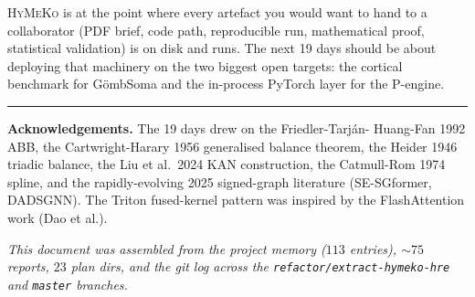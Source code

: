 \documentclass[11pt,a4paper]{article}
\theoremstyle{plain}
\theoremstyle{definition}
\newcommand{\HyMeKo}{\textsc{HyMeKo}}
\newcommand{\code}[1]{\texttt{\small #1}}
\begin{document}
\HyMeKo{} is at the point where every artefact you would want to
hand to a collaborator (PDF brief, code path, reproducible run,
mathematical proof, statistical validation) is on disk and runs.
The next 19 days should be about deploying that machinery on the
two biggest open targets: the cortical benchmark for GömbSoma
and the in-process PyTorch layer for the P-engine.

\vspace{8pt}\hrule\vspace{3pt}
\noindent\footnotesize
\textbf{Acknowledgements.} The 19 days drew on the Friedler-Tarj\'an-
Huang-Fan 1992 ABB, the Cartwright-Harary 1956 generalised balance
theorem, the Heider 1946 triadic balance, the Liu et al.\ 2024 KAN
construction, the Catmull-Rom 1974 spline, and the rapidly-evolving
2025 signed-graph literature (SE-SGformer, DADSGNN). The Triton
fused-kernel pattern was inspired by the FlashAttention work
(Dao et al.).

\textit{This document was assembled from the project memory ($113$
entries), $\sim 75$ reports, $23$ plan dirs, and the git log across
the \code{refactor/extract-hymeko-hre} and \code{master} branches.}
\end{document}
